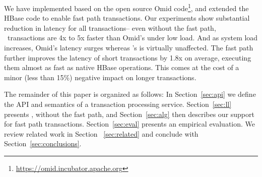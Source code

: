 We have implemented {\sys\/} based on the open source Omid code\footnote{\url{https://omid.incubator.apache.org}}, 
and extended the HBase code to 
enable fast path transactions. Our experiments show substantial reduction in latency for all transactions--
even without the fast path, \sys\ transactions are 4x to 5x faster than Omid's under low load. And as system load increases, 
Omid's latency surges  whereas \sys's is virtually unaffected. 
The fast path further improves the latency of short transactions 
by 1.8x on average, executing them almost as fast as  native HBase operations. This comes 
at the cost of a minor (less than 15\%) negative impact on longer transactions. 



The remainder of this paper is organized as follows:
In Section~\ref{sec:api} we define the  API and semantics of a transaction processing service. 
Section~\ref{sec:ll} presents \sys, without the fast path, and 
Section~\ref{sec:alg} then describes our support for fast path  transactions.  
Section~\ref{sec:eval} presents an empirical evaluation.
We review related work in Section ~\ref{sec:related} and conclude with Section~\ref{sec:conclusions}.
